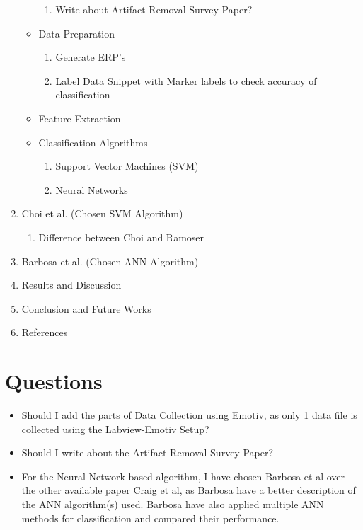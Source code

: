 \documentclass{article}
\begin{document}
\begin{enumerate}
\begin{itemize}
\begin{enumerate}
            \item Write about Artifact Removal Survey Paper?
        \end{enumerate}
        \item Data Preparation
        \begin{enumerate}
            \item Generate ERP's
            \item Label Data Snippet with Marker labels to check accuracy of classification
        \end{enumerate}
        \item Feature Extraction
        \item Classification Algorithms
        \begin{enumerate}
            \item Support Vector Machines (SVM)
            \item Neural Networks
        \end{enumerate}
    \end{itemize}
    \item Choi et al. (Chosen SVM Algorithm)
    \begin{enumerate}
        \item Difference between Choi and Ramoser
    \end{enumerate}
    \item Barbosa et al. (Chosen ANN Algorithm)
    
    \item Results and Discussion
    \item Conclusion and Future Works
    \item References
\end{enumerate}


\section{Questions}
\begin{itemize}
    \item Should I add the parts of Data Collection using Emotiv, as only 1 data file is collected using the Labview-Emotiv Setup?
    \item Should I write about the Artifact Removal Survey Paper?
    \item For the Neural Network based algorithm, I have chosen Barbosa et al over the other available paper Craig et al, as Barbosa have a better description of the ANN algorithm(s) used. Barbosa have also applied multiple ANN methods for classification and compared their performance.
\end{itemize}
 
\end{document}
